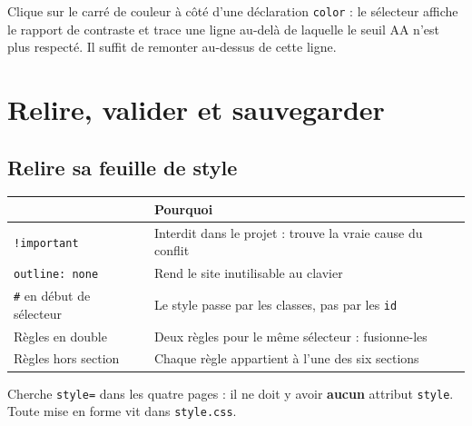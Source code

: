 \documentclass[a4paper,11pt]{article}
\newcommand{\hdr}[1]{\multicolumn{1}{l}{\color{white}\bfseries #1}}
\renewcommand{\arraystretch}{1.3}
\begin{document}
\begin{tcolorbox}[astuce, title={Le sélecteur de couleur des DevTools calcule le contraste}]
Clique sur le carré de couleur à côté d'une déclaration \texttt{color} : le sélecteur affiche le rapport de contraste et trace une ligne au-delà de laquelle le seuil AA n'est plus respecté. Il suffit de remonter au-dessus de cette ligne.
\end{tcolorbox}

\newpage

\section{Relire, valider et sauvegarder}

\subsection{Relire sa feuille de style}

\begin{center}
\renewcommand{\arraystretch}{1.0}
\begin{tabularx}{\linewidth}{p{5.4cm}X}
  \toprule
  \rowcolor{uniNavy}
  \hdr{À chercher dans \texttt{style.css}} & \hdr{Pourquoi} \\
  \midrule
  \rowcolor{uniPaper}
  \texttt{!important} & Interdit dans le projet : trouve la vraie cause du conflit \\
  \texttt{outline: none} & Rend le site inutilisable au clavier \\
  \rowcolor{uniPaper}
  \texttt{\#} en début de sélecteur & Le style passe par les classes, pas par les \texttt{id} \\
  Règles en double & Deux règles pour le même sélecteur : fusionne-les \\
  \rowcolor{uniPaper}
  Règles hors section & Chaque règle appartient à l'une des six sections \\
  \bottomrule
\end{tabularx}
\end{center}

\begin{tcolorbox}[attention, title={Et dans les fichiers HTML}]
Cherche \texttt{style=} dans les quatre pages : il ne doit y avoir \textbf{aucun} attribut \texttt{style}. Toute mise en forme vit dans \texttt{style.css}.
\end{tcolorbox}
\end{document}
